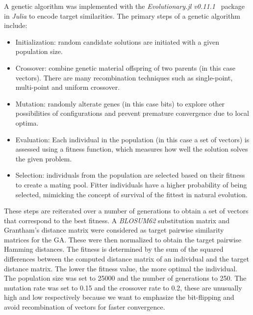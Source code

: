 A genetic algorithm was implemented with the \textit{Evolutionary.jl v0.11.1}~\cite{evojl} package in \textit{Julia} to encode target similarities. The primary steps of a genetic algorithm include:
\begin{itemize}
    \item Initialization: random candidate solutions are initiated with a given population size.
    \item Crossover: combine genetic material offspring of two parents (in this case vectors). There are many recombination techniques such as single-point, multi-point and uniform crossover.
    \item Mutation: randomly alterate genes (in this case bits) to explore other possibilities of configurations and prevent premature convergence due to local optima.
    \item Evaluation: Each individual in the population (in this case a set of vectors) is assessed using a fitness function, which measures how well the solution solves the given problem.
    \item Selection: individuals from the population are selected based on their fitness to create a mating pool. Fitter individuals have a higher probability of being selected, mimicking the concept of survival of the fittest in natural evolution.
\end{itemize}
These steps are reiterated over a number of generations to obtain a set of vectors that correspond to the best fitness. A \textit{BLOSUM62} substitution matrix \cite{blosum} and Grantham's distance matrix \cite{aa_evolution} were considered as target pairwise similarity matrices for the GA. These were then normalized to obtain the target pairwise Hamming distances. The fitness is determined by the sum of the squared differences between the computed distance matrix of an individual and the target distance matrix. The lower the fitness value, the more optimal the individual. The population size was set to 25000 and the number of generations to 250. The mutation rate was set to 0.15 and the crossover rate to 0.2, these are unusually high and low respectively because we want to emphasize the bit-flipping and avoid recombination of vectors for faster convergence.

